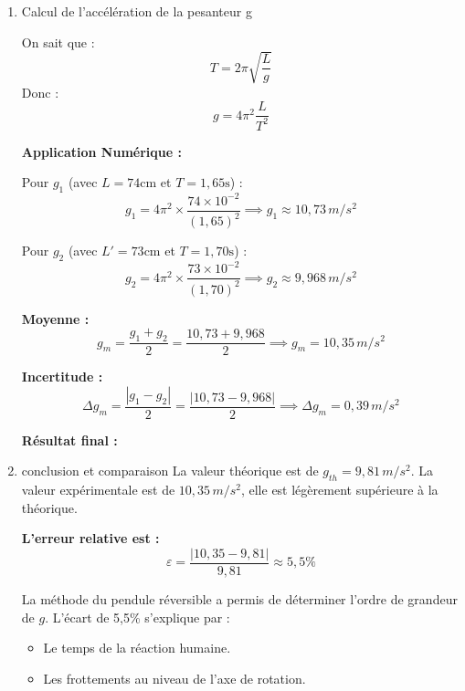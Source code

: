 \documentclass[a4paper,12pt]{article}
\begin{document}
\begin{enumerate}
    \item Calcul de l'accélération de la pesanteur g 

On sait que :
\[ T = 2\pi \sqrt{\frac{L}{g}} \]
Donc :
\[ g = 4\pi^2 \frac{L}{T^2} \]

\noindent \textbf{Application Numérique :}

Pour $g_1$ (avec $L=74\text{cm}$ et $T=1,65\text{s}$) :
\[ g_1 = 4\pi^2 \times \frac{74 \times 10^{-2}}{(1,65)^2} \implies \boxed{g_1 \approx 10,73 \, m/s^2} \]

Pour $g_2$ (avec $L'=73\text{cm}$ et $T=1,70\text{s}$) :
\[ g_2 = 4\pi^2 \times \frac{73 \times 10^{-2}}{(1,70)^2} \implies \boxed{g_2 \approx 9,968 \, m/s^2} \]

\noindent \textbf{Moyenne :}
\[ g_m = \frac{g_1 + g_2}{2} = \frac{10,73 + 9,968}{2} \implies \boxed{g_m = 10,35 \, m/s^2} \]

\noindent \textbf{Incertitude :}
\[ \Delta g_m = \frac{|g_1 - g_2|}{2} = \frac{|10,73 - 9,968|}{2} \implies \boxed{\Delta g_m = 0,39 \, m/s^2} \]

\noindent \textbf{Résultat final :}
\begin{center}
\end{center}

    \item conclusion et comparaison
La valeur théorique est de $g_{th} = 9,81 \, m/s^2$.
La valeur expérimentale est de $10,35 \, m/s^2$, elle est légèrement supérieure à la théorique.

\noindent \textbf{L'erreur relative est :}
\[ \varepsilon = \frac{|10,35 - 9,81|}{9,81} \approx 5,5\% \]

La méthode du pendule réversible a permis de déterminer l'ordre de grandeur de $g$. L'écart de 5,5\% s'explique par :
\begin{itemize}
    \item Le temps de la réaction humaine.
    \item Les frottements au niveau de l'axe de rotation.
\end{itemize}

\end{enumerate}
\end{document}
